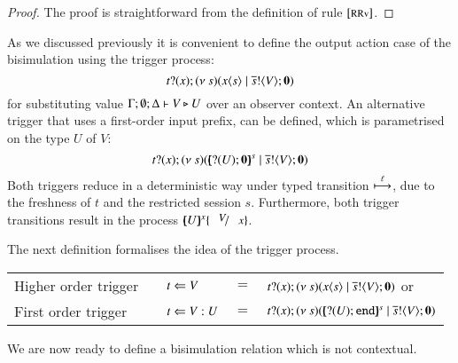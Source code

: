 \begin{proof}
	The proof is straightforward from the definition of rule ${\footnotesize [\textrm{RRv}]}$.
\end{proof}

As we discussed previously it is convenient to define
the output action case of the bisimulation using the
trigger process:
%
\[
	t ? (x) ; (\nu\ s)(x\langle s \rangle \;|\; \overline{s} ! \langle V \rangle ; \mathbf{0})
\]
%
\noi for substituting value $\Gamma; \emptyset; \Delta \vdash V \triangleright U$
over an observer context.
An alternative trigger that uses a first-order input prefix,
can be defined, which is parametrised on the type $U$ of $V$:
%
\[
	t ? (x) ; (\nu\ s)([\!\!(? (U) ; \mathbf{0})\!\!]^{s} \;|\; \overline{s} ! \langle V \rangle ; \mathbf{0})
\]
%
Both triggers reduce in a deterministic way under
typed transition $\stackrel{\ell}{\longmapsto}$, due to the
freshness of $t$ and the restricted session $s$. Furthermore,
both trigger transitions result in the process
$\mapchar{U}{x} \subst{V}{x}$.

The next definition formalises the idea of the trigger process.
%
\begin{definition}\rm
%
	\begin{center}
		\begin{tabular}{lclcl}
			Higher order trigger & & $t \Leftarrow V$ &$=$& $t ? (x) ; (\nu\ s)(x\langle s \rangle \;|\; \overline{s} ! \langle V \rangle ; \mathbf{0})$ or\\
			First order trigger & & $t \Leftarrow V:U$ &$=$& $t ? (x) ; (\nu\ s)([\!\!(? (U) ; \mathtt{end})\!\!]^{s} \;|\; \overline{s} ! \langle V \rangle ; \mathbf{0})$
		\end{tabular}
	\end{center}
\end{definition}

We are now ready to define a bisimulation relation which is not
contextual.

